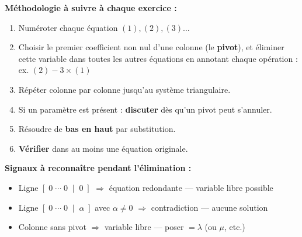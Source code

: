 \documentclass[12pt,a4paper]{article}
\begin{document}
\begin{noteimportante}
\textbf{Méthodologie à suivre à chaque exercice :}
\begin{enumerate}
  \item Numéroter chaque équation $(1), (2), (3)\ldots$
  \item Choisir le premier coefficient non nul d'une colonne (le \textbf{pivot}), et éliminer cette variable dans toutes les autres équations en annotant chaque opération : ex. \textcolor{opcolor}{$(2) - 3\times(1)$}
  \item Répéter colonne par colonne jusqu'au système triangulaire.
  \item Si un paramètre est présent : \textbf{discuter} dès qu'un pivot peut s'annuler.
  \item Résoudre de \textbf{bas en haut} par substitution.
  \item \textbf{Vérifier} dans au moins une équation originale.
\end{enumerate}

\medskip
\textbf{Signaux à reconnaître pendant l'élimination :}
\begin{itemize}[noitemsep]
  \item Ligne $[\;0\;\cdots\;0\;\mid\;0\;]$ $\Rightarrow$ équation redondante --- variable libre possible
  \item Ligne $[\;0\;\cdots\;0\;\mid\;\alpha\;]$ avec $\alpha \neq 0$ $\Rightarrow$ contradiction --- aucune solution
  \item Colonne sans pivot $\Rightarrow$ variable libre --- poser $= \lambda$ (ou $\mu$, etc.)
\end{itemize}
\end{noteimportante}
\end{document}
